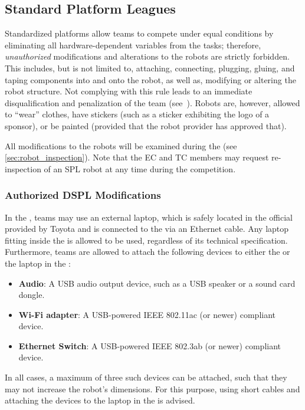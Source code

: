 \subsection{Standard Platform Leagues}

Standardized platforms allow teams to compete under equal conditions by eliminating all hardware-dependent variables from the tasks; therefore, \emph{unauthorized} modifications and alterations to the robots are strictly forbidden.
This includes, but is not limited to, attaching, connecting, plugging, gluing, and taping components into and onto the robot, as well as, modifying or altering the robot structure.
Not complying with this rule leads to an immediate disqualification and penalization of the team (see~).
Robots are, however, allowed to \enquote{wear} clothes, have stickers (such as a sticker exhibiting the logo of a sponsor), or be painted (provided that the robot provider has approved that).

All modifications to the robots will be examined during the \RobotInspection{} (see \ref{sec:robot_inspection}).
Note that the EC and TC members may request re-inspection of an SPL robot at any time during the competition.

\subsubsection{Authorized DSPL Modifications}\label{rule:osl_dspl}

In the \DSPL{}, teams may use an external laptop, which is safely located in the official \MountingBracket{} provided by Toyota and is connected to the \HSR{} via an Ethernet cable.
Any laptop fitting inside the \MountingBracket{} is allowed to be used, regardless of its technical specification.
Furthermore, teams are allowed to attach the following devices to either the \HSR{} or the laptop in the \MountingBracket:
\begin{itemize}
	\item \textbf{Audio}: A USB audio output device, such as a USB speaker or a sound card dongle.
	\item \textbf{Wi-Fi adapter}: A USB-powered IEEE 802.11ac (or newer) compliant device.
	\item \textbf{Ethernet Switch}: A USB-powered IEEE 802.3ab (or newer) compliant device.
\end{itemize}
In all cases, a maximum of three such devices can be attached, such that they may not increase the robot's dimensions.
For this purpose, using short cables and attaching the devices to the laptop in the \MountingBracket{} is advised.
